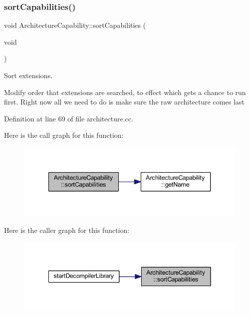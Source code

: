 \subsubsection{\texorpdfstring{sortCapabilities()}{sortCapabilities()}}
{\footnotesize\ttfamily void Architecture\+Capability\+::sort\+Capabilities (\begin{DoxyParamCaption}\item[{void}]{ }\end{DoxyParamCaption})\hspace{0.3cm}{\ttfamily [static]}}



Sort extensions. 

Modify order that extensions are searched, to effect which gets a chance to run first. Right now all we need to do is make sure the raw architecture comes last 

Definition at line 69 of file architecture.\+cc.

Here is the call graph for this function\+:
\nopagebreak
\begin{figure}[H]
\begin{center}
\leavevmode
\includegraphics[width=340pt]{class_architecture_capability_aa2c4dc37eac39cfe01d8ee5ec75d0c61_cgraph}
\end{center}
\end{figure}
Here is the caller graph for this function\+:
\nopagebreak
\begin{figure}[H]
\begin{center}
\leavevmode
\includegraphics[width=342pt]{class_architecture_capability_aa2c4dc37eac39cfe01d8ee5ec75d0c61_icgraph}
\end{center}
\end{figure}


